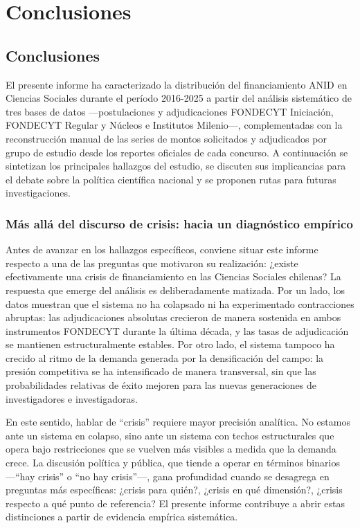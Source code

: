 \documentclass[
  spanish,
  a4paper,
  oneside]{scrbook}
\begin{document}

\chapter{Conclusiones}\label{conclusiones}

\section{Conclusiones}\label{conclusiones-1}

El presente informe ha caracterizado la distribución del financiamiento
ANID en Ciencias Sociales durante el período 2016-2025 a partir del
análisis sistemático de tres bases de datos ---postulaciones y
adjudicaciones FONDECYT Iniciación, FONDECYT Regular y Núcleos e
Institutos Milenio---, complementadas con la reconstrucción manual de
las series de montos solicitados y adjudicados por grupo de estudio
desde los reportes oficiales de cada concurso. A continuación se
sintetizan los principales hallazgos del estudio, se discuten sus
implicancias para el debate sobre la política científica nacional y se
proponen rutas para futuras investigaciones.

\subsection{Más allá del discurso de crisis: hacia un diagnóstico
empírico}\label{muxe1s-alluxe1-del-discurso-de-crisis-hacia-un-diagnuxf3stico-empuxedrico}

Antes de avanzar en los hallazgos específicos, conviene situar este
informe respecto a una de las preguntas que motivaron su realización:
¿existe efectivamente una crisis de financiamiento en las Ciencias
Sociales chilenas? La respuesta que emerge del análisis es
deliberadamente matizada. Por un lado, los datos muestran que el sistema
no ha colapsado ni ha experimentado contracciones abruptas: las
adjudicaciones absolutas crecieron de manera sostenida en ambos
instrumentos FONDECYT durante la última década, y las tasas de
adjudicación se mantienen estructuralmente estables. Por otro lado, el
sistema tampoco ha crecido al ritmo de la demanda generada por la
densificación del campo: la presión competitiva se ha intensificado de
manera transversal, sin que las probabilidades relativas de éxito
mejoren para las nuevas generaciones de investigadores e investigadoras.

En este sentido, hablar de ``crisis'' requiere mayor precisión
analítica. No estamos ante un sistema en colapso, sino ante un sistema
con techos estructurales que opera bajo restricciones que se vuelven más
visibles a medida que la demanda crece. La discusión política y pública,
que tiende a operar en términos binarios ---``hay crisis'' o ``no hay
crisis''---, gana profundidad cuando se desagrega en preguntas más
específicas: ¿crisis para quién?, ¿crisis en qué dimensión?, ¿crisis
respecto a qué punto de referencia? El presente informe contribuye a
abrir estas distinciones a partir de evidencia empírica sistemática.
\end{document}
